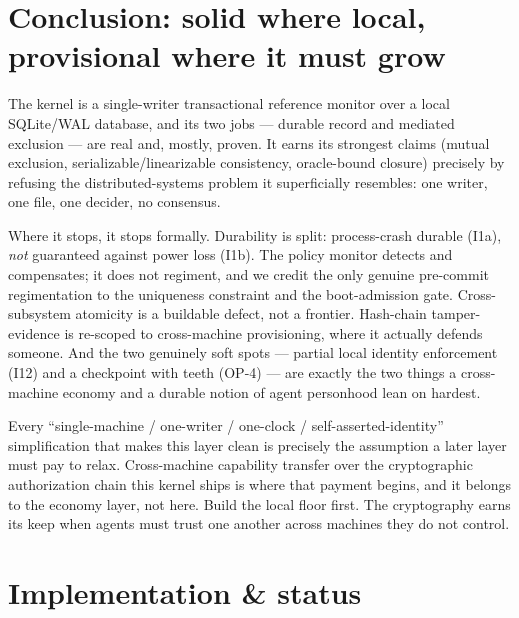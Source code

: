 \documentclass[11pt,a4paper]{article}
\theoremstyle{definition}
\theoremstyle{remark}
\begin{document}
\section{Conclusion: solid where local, provisional where it must grow}

The kernel is a single-writer transactional reference monitor over a local
SQLite/WAL database, and its two jobs --- durable record and mediated exclusion ---
are real and, mostly, proven. It earns its strongest claims (mutual exclusion,
serializable/linearizable consistency, oracle-bound closure) precisely by refusing
the distributed-systems problem it superficially resembles: one writer, one file,
one decider, no consensus.

Where it stops, it stops formally. Durability is split: process-crash durable
(I1a), \emph{not} guaranteed against power loss (I1b). The policy monitor detects
and compensates; it does not regiment, and we credit the only genuine pre-commit
regimentation to the uniqueness constraint and the boot-admission gate. Cross-subsystem
atomicity is a buildable defect, not a frontier. Hash-chain tamper-evidence is
re-scoped to cross-machine provisioning, where it actually defends someone. And the
two genuinely soft spots --- partial local identity enforcement (I12) and a
checkpoint with teeth (OP-4) --- are exactly the two things a cross-machine
economy and a durable notion of agent personhood lean on hardest.


Every ``single-machine / one-writer / one-clock / self-asserted-identity''
simplification that makes this layer clean is precisely the assumption a later
layer must pay to relax. Cross-machine capability transfer over the cryptographic
authorization chain this kernel ships is where that payment begins, and it belongs
to the economy layer, not here. Build the local floor first. The cryptography earns
its keep when agents must trust one another across machines they do not control.

\appendix
\section{Implementation \& status}
\label{app:status}
\end{document}
